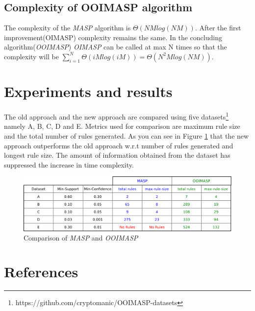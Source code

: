 \documentclass[3p, twocolumn]{elsarticle}
\begin{document}
\subsection{Complexity of OOIMASP algorithm}
The complexity of the \emph{MASP} algorithm \cite{oldmasp} is $ \Theta(NMlog(NM)) $. After the first improvement(OIMASP) complexity remains the same. In the concluding algorithm(\emph{OOIMASP}) \emph{OIMASP} can be called at max N times so that the complexity will be $ \displaystyle\sum_{i=1}^{N} \Theta(iMlog(iM)) = \Theta(N^{2}Mlog(NM)) $.

\section{Experiments and results}

The old approach and the new approach are compared using five datasets\footnote{\label{datasetlink} https://github.com/cryptomanic/OOIMASP-datasets} namely A, B, C, D and E. Metrics used for comparison are maximum rule size and the total number of rules generated. As you can see in Figure \ref{Fig 11} that the new approach outperforms the old approach w.r.t number of rules generated and longest rule size. The amount of information obtained from the dataset has suppressed the increase in time complexity.

\begin{figure}
\begin{center}
\includegraphics[scale=0.30]{pdf/comparison}
\end{center}
\caption{Comparison of \emph{MASP} and \emph{OOIMASP}}
\label{Fig 11}
\end{figure}

\section*{References}


\end{document}
